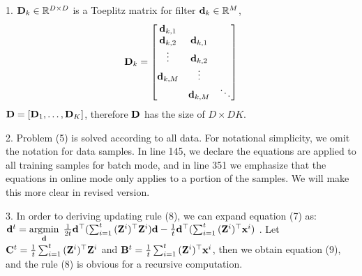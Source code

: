 \documentclass[10pt,twocolumn,letterpaper]{article}
\begin{document}
1. $\Filter_k \in \mathbb{R}^{D \times D}$ is a Toeplitz matrix for filter $\filter_k \in \mathbb{R}^{M}$,
\begin{equation}\label{toeplitz}
 \Filter_k =
 \begin{bmatrix}
    \filter_{k,1} \\
    \filter_{k,2} & \filter_{k,1}\\
    \vdots        & \filter_{k,2}\\
    \filter_{k,M} & \vdots       \\
                  & \filter_{k,M} & \ddots
  \end{bmatrix} \nonumber
\end{equation}
$\Filter = [\Filter_1, \dots, \Filter_K]$, therefore $\Filter$ has the size of $D \times DK$.

2. Problem (5) is solved according to all data. For notational simplicity, we omit the notation for data samples. In line 145, we declare the equations are applied to all training samples for batch mode, and in line 351 we emphasize that the equations in online mode only applies to a portion of the samples. We will make this more clear in revised version.

3. In order to deriving updating rule (8), we can expand equation (7) as:
$\filter^t = \minimize{\filter} \frac{1}{2t} \filter^{\top} (\sum_{i=1}^{t}{(\Code^i)^{\top}\Code^i})\filter - \frac{1}{t}\filter^{\top} (\sum_{i=1}^{t}{(\Code^i)^{\top}\signal^i})$ . %
Let $\surC^t = \frac{1}{t}\sum_{i=1}^{t}{(\Code^i)^{\top}\Code^i}$ and $\surB^t = \frac{1}{t} \sum_{i=1}^{t}{(\Code^i)^{\top}\signal^i}$, then we obtain equation (9), and the rule (8) is obvious for a recursive computation.
\end{document}
